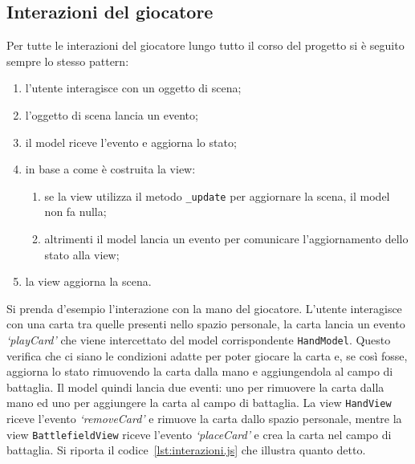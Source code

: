 \subsection{Interazioni del giocatore}
Per tutte le interazioni del giocatore lungo tutto il corso del progetto si è seguito sempre lo stesso pattern:
\begin{enumerate}
    \item l'utente interagisce con un oggetto di scena;
    \item l'oggetto di scena lancia un evento;
    \item il model riceve l'evento e aggiorna lo stato;
    \item in base a come è costruita la view:
    \begin{enumerate} 
        \item se la view utilizza il metodo \texttt{\_update} per aggiornare la scena, il model non fa nulla;
        \item altrimenti il model lancia un evento per comunicare l'aggiornamento dello stato alla view;
    \end{enumerate} 
    \item la view aggiorna la scena.
\end{enumerate} 
Si prenda d'esempio l'interazione con la mano del giocatore. L'utente interagisce con una carta tra quelle presenti nello spazio personale, la carta lancia un evento \textit{`playCard'}
che viene intercettato del model corrispondente \texttt{HandModel}. Questo verifica che ci siano le condizioni adatte per poter giocare la carta e, se così fosse, aggiorna lo stato
rimuovendo la carta dalla mano e aggiungendola al campo di battaglia. Il model quindi lancia due eventi: uno per rimuovere la carta dalla mano ed uno per aggiungere la carta al
campo di battaglia. La view \texttt{HandView} riceve l'evento \textit{`removeCard'} e rimuove la carta dallo spazio personale, mentre la view \texttt{BattlefieldView} riceve l'evento
\textit{`placeCard'} e crea la carta nel campo di battaglia. Si riporta il codice~\ref{lst:interazioni.js} che illustra quanto detto.

